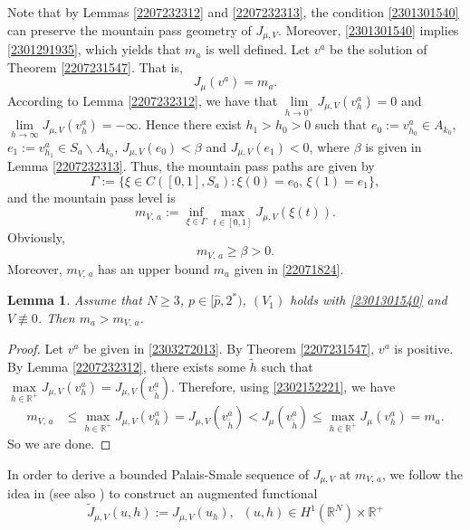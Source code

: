 \documentclass[10pt]{article}
\numberwithin{equation}{section}
\newtheorem{lemma}[theorem]{Lemma}
\numberwithin{equation}{section}
\begin{document}
Note that by Lemmas \ref{2207232312} and \ref{2207232313}, the condition \eqref{2301301540} can preserve the mountain pass geometry of $J_{\mu, V}$. Moreover, \eqref{2301301540} implies \eqref{2301291935}, which yields that $m_a$ is well defined. Let $v^a$ be the solution of Theorem \ref{2207231547}. That is,
\begin{equation}\label{2303272013}
J_{\mu}(v^a)=m_a.
\end{equation}
According to Lemma \ref{2207232312}, we have that $\underset{h\to 0^+}{\lim}J_{\mu, V}(v^a_h)=0$ and  $\underset{h\to \infty}{\lim}J_{\mu, V}(v^a_h)=-\infty$. Hence there exist $h_1>h_0>0$ such that $e_0:=v^a_{h_0}\in A_{k_0}$, $e_1:=v^a_{h_1}\in S_a\backslash A_{k_0}$,
$J_{\mu, V}(e_0)<\beta$ and $J_{\mu, V}(e_1)<0$, where $\beta$ is given in Lemma \ref{2207232313}. Thus, the mountain pass paths are given by
\[
\Gamma:=\{\xi\in C([0,1], S_a): \xi(0)=e_0,\, \xi(1)=e_1\},
\]
and the mountain pass level is
\[
m_{V,\, a}:=\underset{\xi\in\Gamma}{\inf} \underset{t\in [0,1] }{\max} {J_{\mu, V}(\xi(t))}.
\]
Obviously,
\begin{equation}\label{2209120004}
m_{V,\, a}\ge\beta>0.
\end{equation}
Moreover, $m_{V,\, a}$ has an upper bound $m_a$ given in \eqref{22071824}.
\begin{lemma}\label{2207091943}
Assume that $N\ge 3$, $p\in [\hat{p}, 2^*)$, $(V_1)$ holds with \eqref{2301301540} and $V\not\equiv 0$. Then $m_a>m_{V,\, a}$.
\end{lemma}
\begin{proof}
Let $v^a$ be given in \eqref{2303272013}. By Theorem \ref{2207231547}, $v^a$ is positive. By Lemma \ref{2207232312}, there exists some $\widetilde{h}$ such that $\underset{h\in \mathbb{R}^+}{\max} J_{\mu, V}(v^a_h)= J_{\mu, V}( v^a_{\widetilde{h}})$. Therefore, using \eqref{2302152221}, we have
\[
\begin{aligned}
m_{V,\, a} &\le \underset{h\in \mathbb{R}^+}{\max} J_{\mu, V}(v^a_h)= J_{\mu, V}(v^a_{\widetilde{h}})< J_{\mu}( v^a_{\widetilde{h}}) \le \underset{h\in \mathbb{R}^+}{\max} J_{\mu}(v^a_{h})=m_a.
\end{aligned}
\]
So we are done.
\end{proof}
In order to derive a bounded Palais-Smale sequence of $J_{\mu, V}$ at $m_{V,\, a}$, we follow the idea in \cite{Jeanjean97} (see also \cite{BMRV2021,MRV2022}) to construct an augmented functional
\begin{equation}\label{2307301040}
\widetilde{J}_{\mu, V}(u, h):=J_{\mu, V}(u_h),\;\; (u, h)\in H^1(\mathbb{R}^N)\times \mathbb{R}^+
\end{equation}
\end{document}
